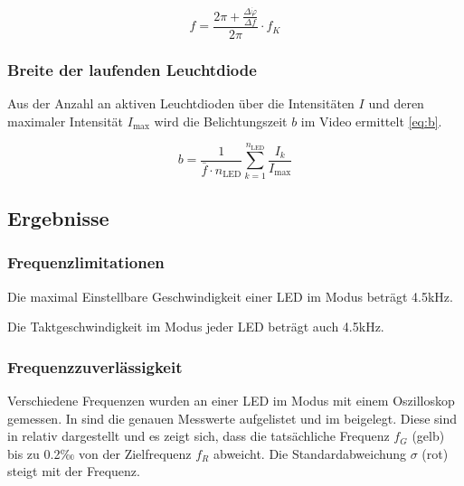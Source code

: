 \begin{equation}\label{eq:f}
    f = \frac{2\pi + \frac{\Delta\dot\varphi}{\Delta f}}{2\pi} \cdot f_K
\end{equation}



\subsubsection{Breite der laufenden Leuchtdiode}\label{sec:Breite-der-laufenden-Leuchtdiode} %

Aus der Anzahl an aktiven Leuchtdioden über die Intensitäten $I$ und deren maximaler Intensität $I_\text{max}$ wird die Belichtungszeit $b$ im Video ermittelt \eqref{eq:b}.


\begin{equation}\label{eq:b}
    b = \frac{1}{\bar f \cdot n_\text{LED}} \sum_{k=1}^{n_\text{LED}} \frac{I_k}{I_\text{max}}
\end{equation}


\subsection{Ergebnisse}

\subsubsection{Frequenzlimitationen}

Die maximal Einstellbare Geschwindigkeit einer LED im  Modus beträgt 4.5kHz.

Die Taktgeschwindigkeit im  Modus jeder LED beträgt auch 4.5kHz.


\subsubsection{Frequenzzuverlässigkeit}

\label{sec:Rider-Modus}

Verschiedene Frequenzen wurden an einer LED im  Modus mit einem Oszilloskop gemessen.
In  sind die genauen Messwerte aufgelistet und im  beigelegt.
Diese sind in  relativ dargestellt und es zeigt sich,
dass
die tatsächliche Frequenz $f_G$ (gelb) bis zu 0.2‰ von der Zielfrequenz $f_R$ abweicht. %
Die Standardabweichung $\sigma$ (rot) steigt mit der Frequenz.

